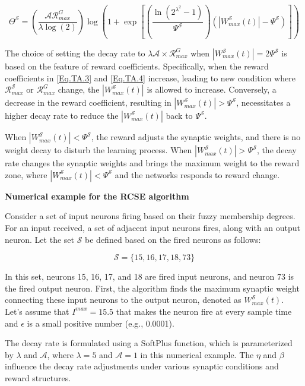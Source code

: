 \begin{equation} \label{Eq.WS.3.1}
    \Theta^{\mathcal{S}} = \left( \frac{\mathcal{A}\mathcal{R}_{max}^{G}}{\lambda\log{(2)}} \right) \log \left(1 + \exp\left[{\left(\frac{\ln{(2^{\lambda^2}-1)}}{\Psi^{\mathcal{S}}} \right) \left( |W_{max}^{\mathcal{S}}(t)| - \Psi^{\mathcal{S}} \right)} \right] \right)
\end{equation}

The choice of setting the decay rate to \(\lambda\mathcal{A} \times \mathcal{R}_{max}^{G}\) when \(|W_{max}^{\mathcal{S}}(t)| = 2 \Psi^{\mathcal{S}}\) is based on the feature of reward coefficients. Specifically, when the reward coefficients in \eqref{Eq.TA.3} and \eqref{Eq.TA.4} increase, leading to new condition where \(\mathcal{R}_{max}^{\mathcal{S}}\) or \(\mathcal{R}_{max}^{G}\) change, the \(|W_{max}^{\mathcal{S}}(t)|\) is allowed to increase. Conversely, a decrease in the reward coefficient, resulting in \(|W_{max}^{\mathcal{S}}(t)| > \Psi^{\mathcal{S}}\), necessitates a higher decay rate to reduce the \(|W_{max}^{\mathcal{S}}(t)|\) back to \(\Psi^{\mathcal{S}}\).


When \(|W_{max}^{\mathcal{S}}(t)| < \Psi^{\mathcal{S}} \), the reward adjusts the synaptic weights, and there is no weight decay to disturb the learning process. When \(|W_{max}^{\mathcal{S}}(t)| > \Psi^{\mathcal{S}} \), the decay rate changes the synaptic weights and brings the maximum weight to the reward zone, where \(|W_{max}^{\mathcal{S}}(t)| < \Psi^{\mathcal{S}} \) and the networks responds to reward change.

\textbf{Numerical example for the \ac{RCSE} algorithm}

Consider a set of input neurons firing based on their fuzzy membership degrees. For an input received, a set of adjacent input neurons fires, along with an output neuron. Let the set \(\mathcal{S}\) be defined based on the fired neurons as follows:

\[
\mathcal{S} = \{15, 16, 17, 18, 73\}
\]

In this set, neurons 15, 16, 17, and 18 are fired input neurons, and neuron 73 is the fired output neuron. First, the algorithm finds the maximum synaptic weight connecting these input neurons to the output neuron, denoted as \(W_{max}^{\mathcal{S}}(t)\). Let's assume that \(I^{max} = 15.5\) that makes the neuron fire at every sample time and \(\epsilon\) is a small positive number (e.g., 0.0001).

The decay rate is formulated using a SoftPlus function, which is parameterized by \(\lambda\) and \(\mathcal{A}\), where \(\lambda = 5\) and \(\mathcal{A} = 1\) in this numerical example. The \(\eta\) and \(\beta\) influence the decay rate adjustments under various synaptic conditions and reward structures.


